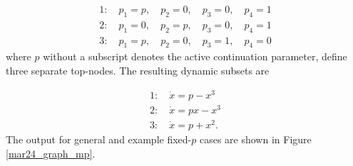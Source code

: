 \documentclass[12pt]{article}
\begin{document}
\begin{equation}
\begin{split}
1: \quad p_1=p, \quad p_2=0, \quad p_3=0, \quad p_4=1 \\ 2: \quad p_1=0, \quad p_2=p, \quad p_3=0, \quad p_4=1 \\ 3: \quad p_1=p, \quad p_2=0, \quad p_3=1, \quad p_4=0
\end{split}
\end{equation}
where $p$ without a subscript denotes the active continuation parameter, define three separate top-nodes. The resulting dynamic subsets are

\begin{equation}
\begin{split}
1: \quad \dot{x}=p-x^3 \\ 2: \quad \dot{x}=px-x^3 \\ 3: \quad \dot{x}=p+x^2.
\end{split}
\end{equation}
The output for general and example fixed-$p$ cases are shown in Figure \ref{mar24_graph_mp}. 
\end{document}
